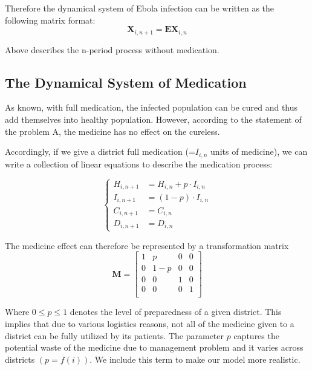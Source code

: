 \documentclass[12pt,a4paper,titlepage]{article}
\begin{document}
Therefore the dynamical system of Ebola infection can be written as the following matrix format: 
\begin{equation}
	\label{eqn_dynamicInfect_matrix}
	\textbf{X}_{i,n+1} = \textbf{EX}_{i,n}
\end{equation}

Above describes the n-period process without medication.

\subsection{The Dynamical System of Medication}
\label{section_dynamicMedi}

As known, with full medication, the infected population can be cured and thus add themselves into healthy population. However, according to the statement of the problem A, the medicine has no effect on the cureless.

Accordingly, if we give a district full medication (=$I_{i,n}$ units of medicine), we can write a collection of linear equations to describe the medication process:

\begin{equation}
	\label{eqn_dynamicMedi_basic}
	\begin{cases}
		H_{i, n+1} & =  H_{i,n} + p \cdot I_{i,n}  \\
		I_{i, n+1} & = (1-p) \cdot I_{i,n} \\
		C_{i, n+1} & = C_{i,n} \\
		D_{i, n+1} & =  D_{i,n}
	\end{cases}
\end{equation}

The medicine effect can therefore be represented by a transformation matrix 
\begin{equation}
	\label{eqn_dynamicMedi_trans}
	\textbf{M} = 
	\begin{bmatrix}
		1 & p & 0 & 0\\
		0 & 1-p & 0 & 0\\
		0 & 0 & 1 & 0\\
		0 & 0 & 0 & 1\\
	\end{bmatrix}
\end{equation}

Where $0\leq p \leq 1$ denotes the level of preparedness \cite{ebolaPrepare20140204} of a given district. This implies that due to various logistics reasons, not all of the medicine given to a district can be fully utilized by its patients. The parameter $p$ captures the potential waste of the medicine due to management problem and it varies across districts $(p=f(i))$. We include this term to make our model more realistic.
\end{document}

